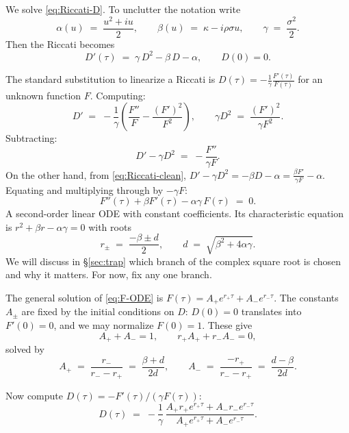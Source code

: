 \documentclass[11pt]{article}
\theoremstyle{plain}
\theoremstyle{definition}
\theoremstyle{remark}
\begin{document}
We solve \eqref{eq:Riccati-D}. To unclutter the notation write
\begin{equation}
    \alpha(u) \;=\; \frac{u^2 + i u}{2}, \qquad
    \beta(u) \;=\; \kappa - i \rho \sigma u, \qquad
    \gamma   \;=\; \frac{\sigma^2}{2}.                                                                          \label{eq:abg}
\end{equation}
Then the Riccati becomes
\begin{equation}
    D'(\tau) \;=\; \gamma\, D^2 - \beta\, D - \alpha, \qquad D(0) = 0.                                          \label{eq:Riccati-clean}
\end{equation}

The standard substitution to linearize a Riccati is \(D(\tau) = -\frac{1}{\gamma}\frac{F'(\tau)}{F(\tau)}\) for an unknown function \(F\). Computing:
\[
    D' \;=\; -\frac{1}{\gamma}\!\left(\frac{F''}{F} - \frac{(F')^2}{F^2}\right), \qquad
    \gamma D^2 \;=\; \frac{(F')^2}{\gamma F^2}.
\]
Subtracting:
\[
    D' - \gamma D^2 \;=\; -\frac{F''}{\gamma F}.
\]
On the other hand, from \eqref{eq:Riccati-clean}, \(D' - \gamma D^2 = -\beta D - \alpha = \frac{\beta F'}{\gamma F} - \alpha\). Equating and multiplying through by \(-\gamma F\):
\begin{equation}
    F''(\tau) + \beta F'(\tau) - \alpha\gamma\, F(\tau) \;=\; 0.                                                \label{eq:F-ODE}
\end{equation}
A second-order linear ODE with constant coefficients. Its characteristic equation is \(r^2 + \beta r - \alpha\gamma = 0\) with roots
\begin{equation}
    r_\pm \;=\; \frac{-\beta \pm d}{2}, \qquad d \;=\; \sqrt{\beta^2 + 4 \alpha \gamma}.                        \label{eq:d-def}
\end{equation}
We will discuss in \S\ref{sec:trap} which branch of the complex square root is chosen and why it matters. For now, fix any one branch.

The general solution of \eqref{eq:F-ODE} is \(F(\tau) = A_+ e^{r_+ \tau} + A_- e^{r_- \tau}\). The constants \(A_\pm\) are fixed by the initial conditions on \(D\): \(D(0) = 0\) translates into \(F'(0) = 0\), and we may normalize \(F(0) = 1\). These give
\[
    A_+ + A_- = 1, \qquad r_+ A_+ + r_- A_- = 0,
\]
solved by
\[
    A_+ \;=\; \frac{r_-}{r_- - r_+} \;=\; \frac{\beta + d}{2 d}, \qquad
    A_- \;=\; \frac{-r_+}{r_- - r_+} \;=\; \frac{d - \beta}{2 d}.
\]

Now compute \(D(\tau) = -F'(\tau)/(\gamma F(\tau))\):
\[
    D(\tau) \;=\; -\frac{1}{\gamma}\,
    \frac{A_+ r_+ e^{r_+ \tau} + A_- r_- e^{r_- \tau}}
         {A_+ e^{r_+ \tau} + A_- e^{r_- \tau}}.
\]
\end{document}
